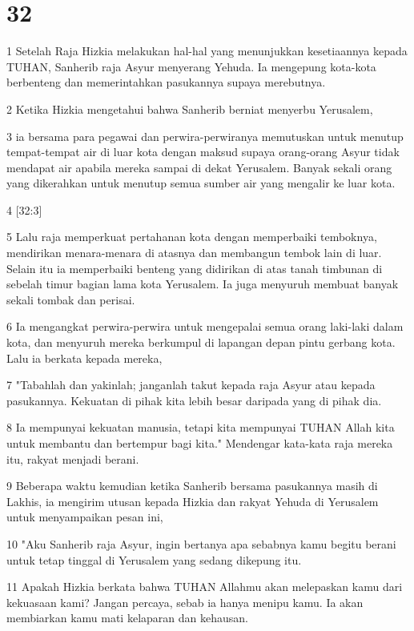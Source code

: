 \chapter{32}

\par 1 Setelah Raja Hizkia melakukan hal-hal yang menunjukkan kesetiaannya kepada TUHAN, Sanherib raja Asyur menyerang Yehuda. Ia mengepung kota-kota berbenteng dan memerintahkan pasukannya supaya merebutnya.
\par 2 Ketika Hizkia mengetahui bahwa Sanherib berniat menyerbu Yerusalem,
\par 3 ia bersama para pegawai dan perwira-perwiranya memutuskan untuk menutup tempat-tempat air di luar kota dengan maksud supaya orang-orang Asyur tidak mendapat air apabila mereka sampai di dekat Yerusalem. Banyak sekali orang yang dikerahkan untuk menutup semua sumber air yang mengalir ke luar kota.
\par 4 [32:3]
\par 5 Lalu raja memperkuat pertahanan kota dengan memperbaiki temboknya, mendirikan menara-menara di atasnya dan membangun tembok lain di luar. Selain itu ia memperbaiki benteng yang didirikan di atas tanah timbunan di sebelah timur bagian lama kota Yerusalem. Ia juga menyuruh membuat banyak sekali tombak dan perisai.
\par 6 Ia mengangkat perwira-perwira untuk mengepalai semua orang laki-laki dalam kota, dan menyuruh mereka berkumpul di lapangan depan pintu gerbang kota. Lalu ia berkata kepada mereka,
\par 7 "Tabahlah dan yakinlah; janganlah takut kepada raja Asyur atau kepada pasukannya. Kekuatan di pihak kita lebih besar daripada yang di pihak dia.
\par 8 Ia mempunyai kekuatan manusia, tetapi kita mempunyai TUHAN Allah kita untuk membantu dan bertempur bagi kita." Mendengar kata-kata raja mereka itu, rakyat menjadi berani.
\par 9 Beberapa waktu kemudian ketika Sanherib bersama pasukannya masih di Lakhis, ia mengirim utusan kepada Hizkia dan rakyat Yehuda di Yerusalem untuk menyampaikan pesan ini,
\par 10 "Aku Sanherib raja Asyur, ingin bertanya apa sebabnya kamu begitu berani untuk tetap tinggal di Yerusalem yang sedang dikepung itu.
\par 11 Apakah Hizkia berkata bahwa TUHAN Allahmu akan melepaskan kamu dari kekuasaan kami? Jangan percaya, sebab ia hanya menipu kamu. Ia akan membiarkan kamu mati kelaparan dan kehausan.
